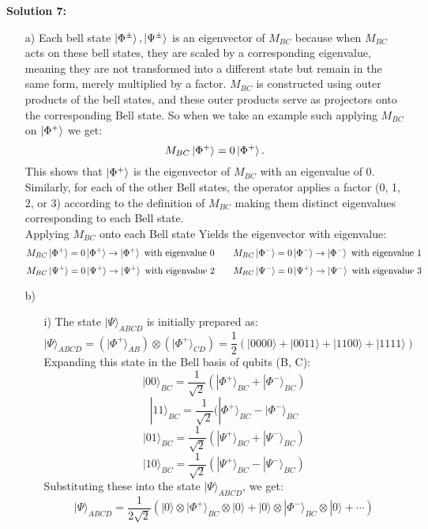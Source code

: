 \documentclass{article}
\begin{document}
\textbf{Solution 7:}
\begin{enumerate}
    \item[a)] Each bell state $\ket{\Phi^\pm},\ket{\Psi^\pm}$ is an eigenvector of $M_{BC}$ because when $M_{BC}$ acts on these bell states, they are scaled by a corresponding eigenvalue, meaning they are not transformed into a different state but remain in the same form, merely multiplied by a factor. $M_{BC}$ is constructed using outer products of the bell states, and these outer products serve as projectors onto the corresponding Bell state. So when we take an example such applying $M_{BC}$ on $\ket{\Phi^+}$ we get: $$M_{BC}\ket{\Phi^+}=0\ket{\Phi^+}.$$ This shows that $\ket{\Phi^+}$ is the eigenvector of $M_{BC}$ with an eigenvalue of 0. Similarly, for each of the other Bell states, the operator applies a factor (0, 1, 2, or 3) according to the definition of $M_{BC}$ making them distinct eigenvalues corresponding to each Bell state.\\  
    Applying $M_{BC}$ onto each Bell state Yields the eigenvector with eigenvalue:\\
            $$M_{BC}\ket{\Phi^+} = 0\ket{\Phi^+} \rightarrow \ket{\Phi^+} \text{ with eigenvalue 0} \qquad M_{BC}\ket{\Phi^-} = 0\ket{\Phi^-} \rightarrow \ket{\Phi^-} \text{ with eigenvalue 1}$$
            $$M_{BC}\ket{\Psi^+} = 0\ket{\Psi^+} \rightarrow \ket{\Psi^+} \text{ with eigenvalue 2} \qquad M_{BC}\ket{\Psi^-} = 0\ket{\Psi^+} \rightarrow \ket{\Psi^-} \text{ with eigenvalue 3}$$
    \item[b)]
    \begin{enumerate}
        \item[i)] The state \( |\Psi\rangle_{ABCD} \) is initially prepared as: $$|\Psi\rangle_{ABCD} = (|\Phi^+\rangle_{AB}) \otimes (|\Phi^+\rangle_{CD}) = \frac{1}{2} (|0000\rangle + |0011\rangle + |1100\rangle + |1111\rangle)$$
        Expanding this state in the Bell basis of qubits (B, C):
        $$|00\rangle_{BC} = \frac{1}{\sqrt{2}} (|\Phi^+\rangle_{BC} + |\Phi^-\rangle_{BC})$$
        $$|11\rangle_{BC} = \frac{1}{\sqrt{2}} (|\Phi^+\rangle_{BC} - |\Phi^-\rangle_{BC}$$
        $$|01\rangle_{BC} = \frac{1}{\sqrt{2}} (|\Psi^+\rangle_{BC} + |\Psi^-\rangle_{BC})$$
        $$|10\rangle_{BC} = \frac{1}{\sqrt{2}} (|\Psi^+\rangle_{BC} - |\Psi^-\rangle_{BC})$$
        Substituting these into the state \( |\Psi\rangle_{ABCD} \), we get:
        $$|\Psi\rangle_{ABCD} = \frac{1}{2\sqrt{2}} \left( |0\rangle \otimes |\Phi^+\rangle_{BC} \otimes |0\rangle + |0\rangle \otimes |\Phi^-\rangle_{BC} \otimes |0\rangle + \cdots \right)$$


\end{enumerate}
\end{enumerate}
\end{document}
